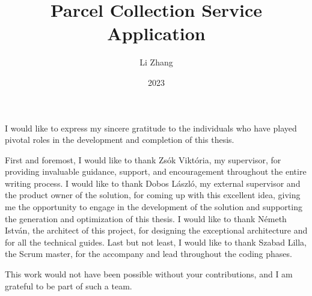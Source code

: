 \documentclass[
]{elteikthesis}[2023/04/10]
\title{Parcel Collection Service Application } %
\date{2023} %
\author{Li Zhang}
\affiliation{Assistant Professor} %
\begin{document}


\maketitle


\tableofcontents
\cleardoublepage


\cleardoublepage


\cleardoublepage


\cleardoublepage


\cleardoublepage

\chapter*{\acklabel}
I would like to express my sincere gratitude to the individuals who have played pivotal roles in the development and completion of this thesis.

First and foremost, I would like to thank Zsók Viktória, my supervisor, for providing invaluable guidance, support, and encouragement throughout the entire writing process. 
I would like to thank Dobos László, my external supervisor and the product owner of the solution, for coming up with this excellent idea, giving me the opportunity to engage in the development of the solution and supporting the generation and optimization of this thesis.
I would like to thank Németh István, the architect of this project, for designing the exceptional architecture and for all the technical guides.
Last but not least, I would like to thank Szabad Lilla, the Scrum master, for the accompany and lead throughout the coding phases.

This work would not have been possible without your contributions, and I am grateful to be part of such a team.

\appendix

\cleardoublepage
\end{document}
